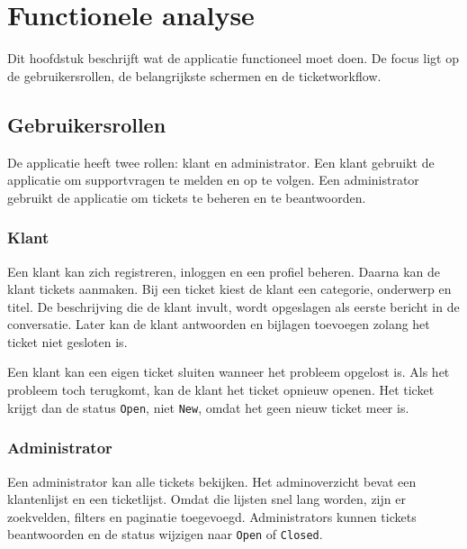 ﻿%

\chapter{Functionele analyse}%
\label{ch:functionele-analyse}

Dit hoofdstuk beschrijft wat de applicatie functioneel moet doen. De focus ligt op de gebruikersrollen, de belangrijkste schermen en de ticketworkflow.

\section{Gebruikersrollen}

De applicatie heeft twee rollen: klant en administrator. Een klant gebruikt de applicatie om supportvragen te melden en op te volgen. Een administrator gebruikt de applicatie om tickets te beheren en te beantwoorden.

\subsection{Klant}

Een klant kan zich registreren, inloggen en een profiel beheren. Daarna kan de klant tickets aanmaken. Bij een ticket kiest de klant een categorie, onderwerp en titel. De beschrijving die de klant invult, wordt opgeslagen als eerste bericht in de conversatie. Later kan de klant antwoorden en bijlagen toevoegen zolang het ticket niet gesloten is.

Een klant kan een eigen ticket sluiten wanneer het probleem opgelost is. Als het probleem toch terugkomt, kan de klant het ticket opnieuw openen. Het ticket krijgt dan de status \texttt{Open}, niet \texttt{New}, omdat het geen nieuw ticket meer is.

\subsection{Administrator}

Een administrator kan alle tickets bekijken. Het adminoverzicht bevat een klantenlijst en een ticketlijst. Omdat die lijsten snel lang worden, zijn er zoekvelden, filters en paginatie toegevoegd. Administrators kunnen tickets beantwoorden en de status wijzigen naar \texttt{Open} of \texttt{Closed}.

